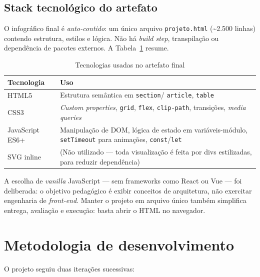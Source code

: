 \subsection{Stack tecnológico do artefato}

O infográfico final é \emph{auto-contido}: um único arquivo
\texttt{projeto.html} (\textasciitilde 2.500 linhas) contendo
estrutura, estilos e lógica. Não há \emph{build step}, transpilação
ou dependência de pacotes externos. A Tabela~\ref{tab:stack} resume.

\begin{table}[h!]
\centering
\caption{Tecnologias usadas no artefato final}
\label{tab:stack}
\begin{tabular}{lp{8cm}}
\toprule
\textbf{Tecnologia} & \textbf{Uso} \\
\midrule
HTML5            & Estrutura semântica em \texttt{section}/
                   \texttt{article}, \texttt{table} \\
CSS3             & \emph{Custom properties}, \texttt{grid},
                   \texttt{flex}, \texttt{clip-path}, transições,
                   \emph{media queries} \\
JavaScript ES6+  & Manipulação de DOM, lógica de estado em
                   variáveis-módulo, \texttt{setTimeout} para
                   animações, \texttt{const}/\texttt{let} \\
SVG inline       & (Não utilizado --- toda visualização é
                   feita por divs estilizadas, para reduzir
                   dependência) \\
\bottomrule
\end{tabular}
\end{table}

A escolha de \emph{vanilla} JavaScript --- sem frameworks como React
ou Vue --- foi deliberada: o objetivo pedagógico é exibir conceitos
de arquitetura, não exercitar engenharia de \emph{front-end}.
Manter o projeto em arquivo único também simplifica entrega,
avaliação e execução: basta abrir o HTML no navegador.

\section{Metodologia de desenvolvimento}
\label{sec:metodologia-dev}

O projeto seguiu duas iterações sucessivas:

